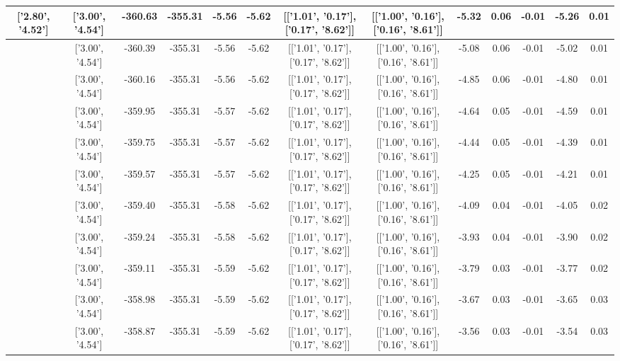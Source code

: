 \begin{table}[htbp]
\begin{adjustbox}{angle=90}
\begin{tabular}{|c|c|c|c|c|c|c|c|c|c|c|c|c|}
 ['2.80', '4.52'] & ['3.00', '4.54'] & -360.63 & -355.31 & -5.56 & -5.62 & [['1.01', '0.17'], ['0.17', '8.62']] & [['1.00', '0.16'], ['0.16', '8.61']] & -5.32 & 0.06 & -0.01 & -5.26 & 0.01\\ \hline
 ['2.81', '4.53'] & ['3.00', '4.54'] & -360.39 & -355.31 & -5.56 & -5.62 & [['1.01', '0.17'], ['0.17', '8.62']] & [['1.00', '0.16'], ['0.16', '8.61']] & -5.08 & 0.06 & -0.01 & -5.02 & 0.01\\ \hline
 ['2.82', '4.53'] & ['3.00', '4.54'] & -360.16 & -355.31 & -5.56 & -5.62 & [['1.01', '0.17'], ['0.17', '8.62']] & [['1.00', '0.16'], ['0.16', '8.61']] & -4.85 & 0.06 & -0.01 & -4.80 & 0.01\\ \hline
 ['2.83', '4.53'] & ['3.00', '4.54'] & -359.95 & -355.31 & -5.57 & -5.62 & [['1.01', '0.17'], ['0.17', '8.62']] & [['1.00', '0.16'], ['0.16', '8.61']] & -4.64 & 0.05 & -0.01 & -4.59 & 0.01\\ \hline
 ['2.85', '4.53'] & ['3.00', '4.54'] & -359.75 & -355.31 & -5.57 & -5.62 & [['1.01', '0.17'], ['0.17', '8.62']] & [['1.00', '0.16'], ['0.16', '8.61']] & -4.44 & 0.05 & -0.01 & -4.39 & 0.01\\ \hline
 ['2.86', '4.53'] & ['3.00', '4.54'] & -359.57 & -355.31 & -5.57 & -5.62 & [['1.01', '0.17'], ['0.17', '8.62']] & [['1.00', '0.16'], ['0.16', '8.61']] & -4.25 & 0.05 & -0.01 & -4.21 & 0.01\\ \hline
 ['2.87', '4.53'] & ['3.00', '4.54'] & -359.40 & -355.31 & -5.58 & -5.62 & [['1.01', '0.17'], ['0.17', '8.62']] & [['1.00', '0.16'], ['0.16', '8.61']] & -4.09 & 0.04 & -0.01 & -4.05 & 0.02\\ \hline
 ['2.88', '4.53'] & ['3.00', '4.54'] & -359.24 & -355.31 & -5.58 & -5.62 & [['1.01', '0.17'], ['0.17', '8.62']] & [['1.00', '0.16'], ['0.16', '8.61']] & -3.93 & 0.04 & -0.01 & -3.90 & 0.02\\ \hline
 ['2.89', '4.53'] & ['3.00', '4.54'] & -359.11 & -355.31 & -5.59 & -5.62 & [['1.01', '0.17'], ['0.17', '8.62']] & [['1.00', '0.16'], ['0.16', '8.61']] & -3.79 & 0.03 & -0.01 & -3.77 & 0.02\\ \hline
 ['2.91', '4.53'] & ['3.00', '4.54'] & -358.98 & -355.31 & -5.59 & -5.62 & [['1.01', '0.17'], ['0.17', '8.62']] & [['1.00', '0.16'], ['0.16', '8.61']] & -3.67 & 0.03 & -0.01 & -3.65 & 0.03\\ \hline
 ['2.92', '4.53'] & ['3.00', '4.54'] & -358.87 & -355.31 & -5.59 & -5.62 & [['1.01', '0.17'], ['0.17', '8.62']] & [['1.00', '0.16'], ['0.16', '8.61']] & -3.56 & 0.03 & -0.01 & -3.54 & 0.03\\ \hline

\end{tabular}
\end{adjustbox}
\end{table}
